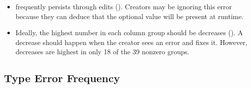 \documentclass[english,submission,cleveref]{programming}
\begin{document}
\begin{itemize}
  \item
     frequently persists through edits (\keepsym{}).
    Creators may be ignoring this error because they can deduce that the
    optional value will be present at runtime.

  \item
    Ideally, the highest number in each column group should
    be decreases (\dropsym{}).
    A decrease should happen when the creator sees an error and
    fixes it.
    However, decreases are highest in only 18 of the 39 nonzero groups.




\end{itemize}



\subsection{Type Error Frequency}
\label{s:type-error-count}
\end{document}

